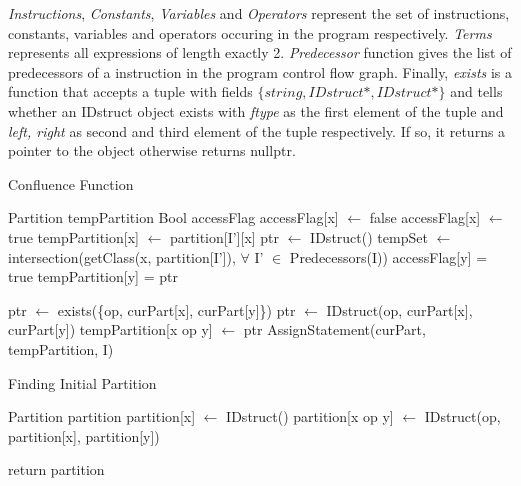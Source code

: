 \textit{Instructions}, \textit{Constants}, \textit{Variables} and 
\textit{Operators} represent the set of instructions, constants, 
variables and operators occuring in the program respectively. \textit
{Terms} represents all expressions of length exactly 2. \textit
{Predecessor} function gives the list of predecessors of a 
instruction in the program control flow graph. Finally, \textit
{exists} is a function that accepts a tuple with fields 
$\{string, IDstruct *, IDstruct *\}$ and tells whether an IDstruct 
object exists with \textit{ftype} as the first element of the tuple 
and \textit{left, right} as second and third element of the tuple 
respectively. If so, it returns a pointer to the object otherwise 
returns nullptr.

\begin{algorithm}
\caption{Confluence Function}\label{Confluence}
\begin{algorithmic}[1]
    \State Partition tempPartition
    \State Bool accessFlag
    \State
        accessFlag[x] $\gets$ false
    \EndFor
    \State
            \State accessFlag[x] $\gets$ true
                \State tempPartition[x] $\gets$ partition[I'][x]
            \Else
                \State ptr $\gets$ IDstruct()
                \State tempSet $\gets$ intersection(getClass(x, partition[I']), $\forall$ I' $\in$ Predecessors(I))
                    \State accessFlag[y] = true
                    \State tempPartition[y] = ptr
                \EndFor
            \EndIf
        \EndIf
    \EndFor

        \State ptr $\gets$ exists(\{op, curPart[x], curPart[y]\})
            \State ptr $\gets$ IDstruct(op, curPart[x], curPart[y])
        \EndIf
        \State tempPartition[x op y] $\gets$ ptr
    \EndFor
    \State
    \State AssignStatement(curPart, tempPartition, I)
\EndProcedure
\end{algorithmic}
\end{algorithm}

\begin{algorithm}
\caption{Finding Initial Partition}\label{InitialPartition}
\begin{algorithmic}[1]
    \State Partition partition
        \State partition[x] $\gets$ IDstruct()
    \EndFor
        \State partition[x op y] $\gets$ IDstruct(op, partition[x], partition[y])
    \EndFor

    \State return partition
\EndProcedure
\end{algorithmic}
\end{algorithm}

